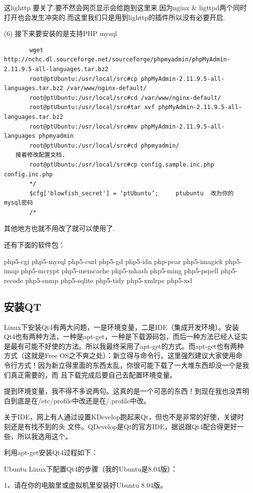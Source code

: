 这lighttp 要关了.要不然会网页显示会给跑到这里来.因为nginx \& ligttpd两个同时打开也会发生冲突的.而这里我们只是用到lighttp的插件所以没有必要开启.

(6) 接下来要安装的是支持PHP mysql
\begin{verbatim}
　　    wget http://nchc.dl.sourceforge.net/sourceforge/phpmyadmin/phpMyAdmin-2.11.9.5-all-languages.tar.bz2
　　    root@ptUbuntu:/usr/local/src#cp phpMyAdmin-2.11.9.5-all-languages.tar.bz2 /var/www/nginx-default/
　　    root@ptUbuntu:/usr/local/src#cd /var/www/nginx-default/
　　    root@ptUbuntu:/usr/local/src#tar xvf phpMyAdmin-2.11.9.5-all-languages.tar.bz2
　　    root@ptUbuntu:/usr/local/src#mv phpMyAdmin-2.11.9.5-all-languages phpmyadmin
　　    root@ptUbuntu:/usr/local/src#cd phpmyadmin/
　　接着修改配置文档.
　　    root@ptUbuntu:/usr/local/src#cp config.sample.inc.php config.inc.php
　　    */
　　    $cfg['blowfish_secret'] = ‘ptUbuntu’;     ptubuntu  改为你的mysql密码
　　    /*
\end{verbatim}

其他地方也就不用改了就可以使用了.

还有下面的软件包：

php5-cgi php5-mysql php5-curl php5-gd php5-idn php-pear php5-imagick php5-imap php5-mcrypt php5-memcache php5-mhash php5-ming php5-pspell php5-recode php5-snmp php5-sqlite php5-tidy php5-xmlrpc php5-xsl
　　
\subsection{安装QT}
Linux下安装Qt4有两大问题，一是环境变量，二是IDE（集成开发环境）。安装Qt4也有两种方法，一种是apt-get，一种是下载源码包，而后一种方法已经人证实是最有可能不好使的方法。所以我最终采用了apt-get的方式。而apt-get也有两种方式（这就是Free OS之不爽之处）：新立得与命令行。这里强烈建议大家使用命令行方式！因为新立得里面的东西太乱，你很可能下载了一大堆东西却没一个是我们真正需要的，而 且下载完成后要自己去配置环境变量。

提到环境变量，我不得不多说两句。这真的是一个可恶的东西！到现在我也没弄明白到底是在/etc/profile中改还是在/.profile中改。

关于IDE，网上有人通过设置KDevelop跑起来Qt，但也不是非常的好使，关键时刻还是有找不到的头 文件。QDevelop是Qt的官方IDE，据说跟Qt4配合得更好一些，所以我选用这个。

利用apt-get安装Qt4过程如下：

Ubuntu Linux下配置Qt4的步骤（我的Ubuntu是8.04版）：

1、请在你的电脑里或虚拟机里安装好Ubuntu 8.04版。

